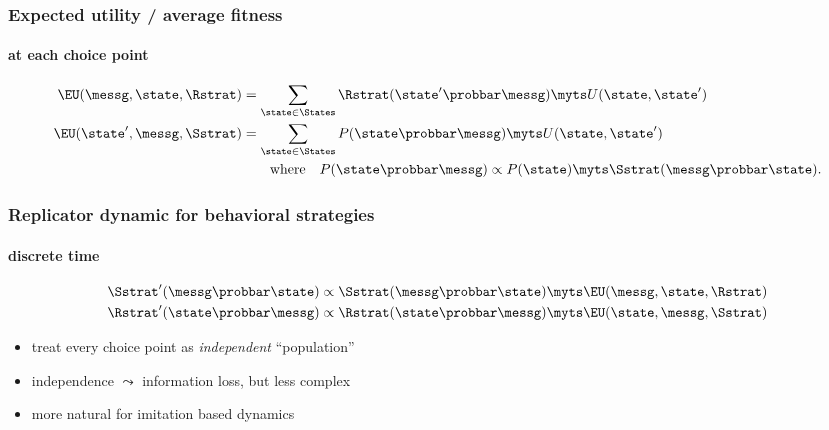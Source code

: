 \documentclass[fleqn,9pt,xcolor=dvipsnames]{beamer}
\renewcommand{\Pr}{\ensuremath{P}}
\begin{document}
\begin{frame}
  \frametitle{Expected utility / average fitness}
  \framesubtitle{at each choice point}

  \begin{align*}
    \EU(\messg, \state, \Rstrat) & = \sum_{\state \in \States}
    \Rstrat(\state' \probbar \messg) \myts U(\state, \state') \\
    \EU(\state', \messg, \Sstrat) & = \sum_{\state \in
      \States} P(\state \probbar \messg)  \myts
    U(\state, \state') \\
    & \ \ \ \ \text{\ \  where } \ \  
    P(\state \probbar \messg) \propto \Pr(\state) \myts \Sstrat(\messg \probbar \state) .
  \end{align*}

\end{frame}

\begin{frame}
  \frametitle{Replicator dynamic for behavioral strategies}
  \framesubtitle{discrete time}
    
\begin{align*}
  \Sstrat'(\messg \probbar \state) & \propto \Sstrat(\messg \probbar \state) \myts
    \EU(\messg, \state,\Rstrat) \\ \Rstrat'(\state \probbar \messg) & \propto \Rstrat(\state \probbar \messg) \myts
    \EU(\state, \messg,\Sstrat)   
\end{align*}

\bigskip\bigskip

\begin{itemize}
\item  treat every choice point as \emph{independent}
    ``population''
\item independence $\leadsto$ information loss, but less complex
\item more natural for imitation based dynamics
\end{itemize}


\end{frame}


\end{document}
